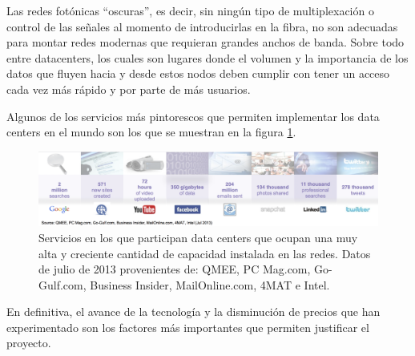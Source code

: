 Las redes fotónicas ``oscuras'', es decir, sin ningún tipo de
multiplexación o control de las señales al momento de introducirlas en
la fibra, no son adecuadas para montar redes modernas que requieran
grandes anchos de banda. Sobre todo entre datacenters, los cuales son
lugares donde el volumen y la importancia de los datos que fluyen
hacia y desde estos nodos deben cumplir con tener un acceso cada vez
más rápido y por parte de más usuarios.

Algunos de los servicios más pintorescos que permiten implementar los
data centers en el mundo son los que se muestran en la figura
\ref{fig:servicios}.

\begin{figure}[H]
  \centering
  \includegraphics[width=15cm]{Imagenes/servicios.png}
  \caption{Servicios en los que participan data centers que ocupan una
    muy alta y creciente cantidad de capacidad instalada en las
    redes. Datos de julio de 2013 provenientes de: QMEE, PC Mag.com,
    Go-Gulf.com, Business Insider, MailOnline.com, 4MAT e Intel.}
  \label{fig:servicios}
\end{figure}

En definitiva, el avance de la tecnología y la disminución de precios
que han experimentado son los factores más importantes que permiten
justificar el proyecto. 
